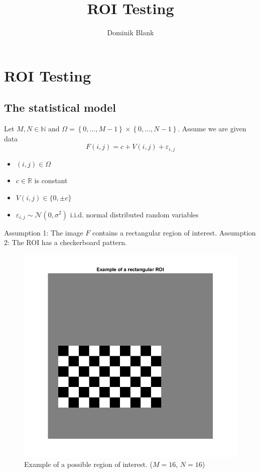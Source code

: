 \documentclass{beamer}
\author{Dominik Blank}
\title{ROI Testing}
\institute{Georg-August-Universität Göttingen}
\begin{document}
\begin{frame}
	\maketitle
\end{frame}

\begin{frame}
	\tableofcontents
\end{frame}

\section{ROI Testing}

\subsection{The statistical model}

\begin{frame}
	Let $M, N \in \mathbb{N}$ and $\Omega = \left\{ 0, \dots, M-1 \right\} \times  \left\{ 0, \dots, N-1 \right\}$. Assume we are given data
	\begin{equation*}\label{model}
		F(i, j) = c + V(i, j) + \varepsilon_{i, j}
	\end{equation*}
	\begin{itemize}
		\item $(i, j) \in \Omega$
		\item $c \in \mathbb{R}$ is constant
		\item $V(i, j) \in \{ 0, \pm c \}$
		\item $\varepsilon_{i, j} \sim \mathcal{N}(0, \sigma^2)$ i.i.d. normal distributed random variables
	\end{itemize}
	
	Assumption 1: The image $F$ contains a rectangular region of interest.
	Assumption 2: The ROI has a checkerboard pattern.
\end{frame}

\begin{frame}
	\begin{figure}
		\includegraphics[width=0.6\linewidth]{Testing/ROI}
		\caption[ROI]{Example of a possible region of interest. ($M = 16$, $N = 16$)}
		\label{fig:ROI}
	\end{figure}
\end{frame}
\end{document}
